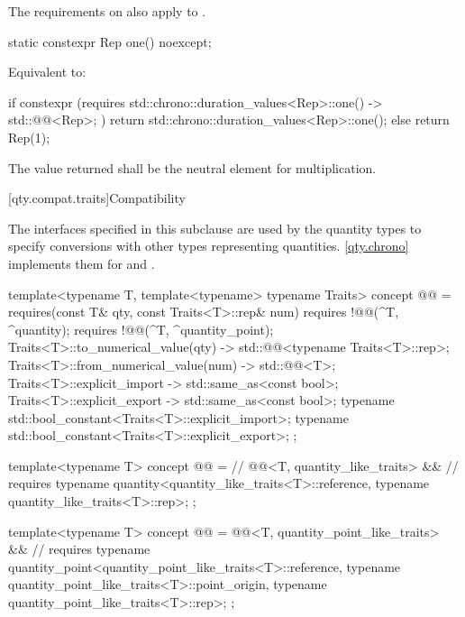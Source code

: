 \pnum
The requirements on 
also apply to .

\begin{itemdecl}
static constexpr Rep one() noexcept;
\end{itemdecl}

\begin{itemdescr}
\pnum
\effects
Equivalent to:
\begin{codeblock}
if constexpr (requires {
                { std::chrono::duration_values<Rep>::one() } -> std::@@<Rep>;
              })
  return std::chrono::duration_values<Rep>::one();
else
  return Rep(1);
\end{codeblock}

\pnum
\remarks
The value returned shall be the neutral element for multiplication.
\end{itemdescr}

[qty.compat.traits]{Compatibility}

\pnum
The interfaces specified in this subclause
are used by the quantity types
to specify conversions with other types representing quantities.
\ref{qty.chrono} implements them for  and .

\begin{itemdecl}
template<typename T, template<typename> typename Traits>
concept @@ = requires(const T& qty, const Traits<T>::rep& num) {
  requires !@@(^T, ^quantity);
  requires !@@(^T, ^quantity_point);
  { Traits<T>::to_numerical_value(qty) } -> std::@@<typename Traits<T>::rep>;
  { Traits<T>::from_numerical_value(num) } -> std::@@<T>;
  { Traits<T>::explicit_import } -> std::same_as<const bool>;
  { Traits<T>::explicit_export } -> std::same_as<const bool>;
  typename std::bool_constant<Traits<T>::explicit_import>;
  typename std::bool_constant<Traits<T>::explicit_export>;
};

template<typename T>
concept @@ =                 //
  @@<T, quantity_like_traits> &&  //
  requires {
    typename quantity<quantity_like_traits<T>::reference, typename quantity_like_traits<T>::rep>;
  };

template<typename T>
concept @@ =
  @@<T, quantity_point_like_traits> &&  //
  requires {
    typename quantity_point<quantity_point_like_traits<T>::reference,
                            typename quantity_point_like_traits<T>::point_origin,
                            typename quantity_point_like_traits<T>::rep>;
  };
\end{itemdecl}

